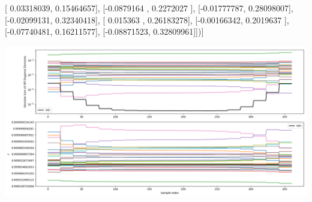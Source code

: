 \documentclass{article}
\begin{document}
       [ 0.03318039,  0.15464657],
       [-0.0879164 ,  0.2272027 ],
       [-0.01777787,  0.28098007],
       [-0.02099131,  0.32340418],
       [ 0.015363  ,  0.26183278],
       [-0.00166342,  0.2019637 ],
       [-0.07740481,  0.16211577],
       [-0.08871523,  0.32809961]])]
\begin{center}
\includegraphics[scale=.9]{report_pickled_controls235/control_dpn_all.png}

\end{center}
\end{document}
